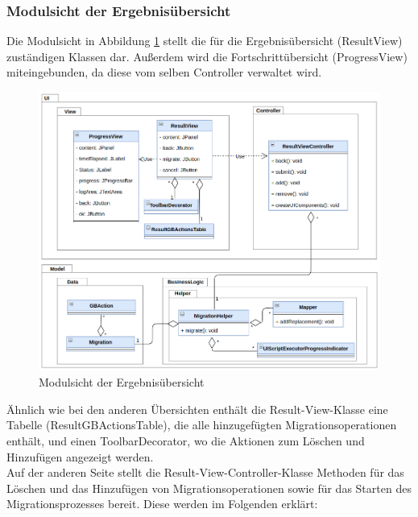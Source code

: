 	
	
	\subsubsection{Modulsicht der Ergebnisübersicht}
	Die Modulsicht in Abbildung \ref{img:modulsicht-resul} stellt die für die Ergebnisübersicht (ResultView) zuständigen Klassen dar. Außerdem wird die Fortschrittübersicht (ProgressView) miteingebunden, da diese vom selben Controller verwaltet wird.
	\begin{figure}[H]
		\centering
		\includegraphics[width=\textwidth]{images/sichten/modulsicht-result}
		\caption{Modulsicht der Ergebnisübersicht}
		\label{img:modulsicht-resul}
	\end{figure}
	
	Ähnlich wie bei den anderen Übersichten enthält die Result-View-Klasse eine Tabelle (ResultGBActionsTable), die alle hinzugefügten Migrationsoperationen enthält, und einen ToolbarDecorator, wo die Aktionen zum Löschen und Hinzufügen angezeigt werden. \\
	Auf der anderen Seite stellt die Result-View-Controller-Klasse Methoden für das Löschen und das Hinzufügen von Migrationsoperationen sowie für das Starten des Migrationsprozesses bereit. Diese werden im Folgenden erklärt:
	

